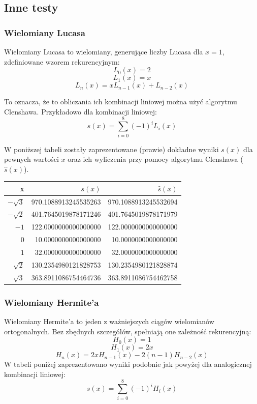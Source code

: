 \documentclass[11pt,leqno]{article}
\begin{document}
\subsection{Inne testy}

\subsubsection{Wielomiany Lucasa}
Wielomiany Lucasa to wielomiany, generujące liczby Lucasa dla $x = 1$, zdefiniowane wzorem rekurencyjnym:
\[
L_0(x) = 2
\]
\[
L_1(x) = x
\]
\[
L_n(x) = x L_{n - 1}(x) + L_{n - 2}(x)
\]

To oznacza, że to obliczania ich kombinacji liniowej można użyć algorytmu Clenshawa. Przykładowo dla kombinacji liniowej:
\[
  s(x) = \sum_{i = 0}^8 (-1)^i L_i(x)
\]

W poniższej tabeli zostały zaprezentowane (prawie) dokładne wyniki $s(x)$ dla pewnych wartości $x$ oraz ich wyliczenia przy pomocy algorytmu Clenshawa ($\hat{s}(x)$).

\begin{center}
\begin{tabular}{ r || r | r }
  \hline
  x & $s(x)$ & $\hat{s}(x)$ \\
  \hline \hline
  $-\sqrt{3}$ & 970.1088913245535263 & 970.1088913245532694 \\
  $-\sqrt{2}$ & 401.7645019878171246 & 401.7645019878171979 \\
  $-1$        & 122.0000000000000000 & 122.0000000000000000 \\
  $0$         &  10.0000000000000000 & 10.0000000000000000  \\
  $1$         &  32.0000000000000000 & 32.0000000000000000  \\
  $\sqrt{2}$  & 130.2354980121828753 & 130.2354980121828874 \\
  $\sqrt{3}$  & 363.8911086754464736 & 363.8911086754462758
\end{tabular}
\end{center}


\subsubsection{Wielomiany Hermite'a}
Wielomiany Hermite'a to jeden z ważniejszych ciągów wielomianów ortogonalnych. Bez zbędnych szczegółów, spełniają one zależność rekurencyjną:
\[
  H_0(x) = 1
\]
\[
  H_1(x) = 2x
\]
\[
  H_n(x) = 2x H_{n - 1}(x) - 2(n - 1) H_{n - 2}(x)
\]
W tabeli poniżej zaprezentowano wyniki podobnie jak powyżej dla analogicznej kombinacji liniowej:
\[
  s(x) = \sum_{i = 0}^8 (-1)^i H_i(x)
\]
\end{document}
